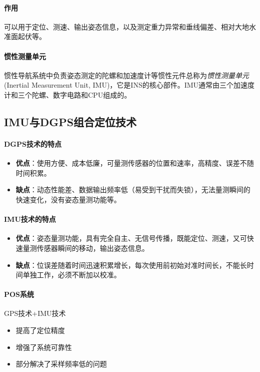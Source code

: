 \paragraph{作用}可以用于定位、测速、输出姿态信息，以及测定重力异常和垂线偏差、相对大地水准面起伏等。

\paragraph{惯性测量单元} 惯性导航系统中负责姿态测定的陀螺和加速度计等惯性元件总称为\textit{惯性测量单元}(Inertial Measurement Unit, IMU)，它是INS的核心部件。IMU通常由三个加速度计和三个陀螺、数字电路和CPU组成的。

\subsection{IMU与DGPS组合定位技术} %
\paragraph{DGPS技术的特点}
\begin{itemize}
	\item \textbf{优点}：使用方便、成本低廉，可量测传感器的位置和速率，高精度、误差不随时间积累。
	\item \textbf{缺点}：动态性能差、数据输出频率低（易受到干扰而失锁），无法量测瞬间的快速变化，没有姿态量测功能等。
\end{itemize}

\paragraph{IMU技术的特点}
\begin{itemize}
	\item \textbf{优点}：姿态量测功能，具有完全自主、无信号传播，既能定位、测速，又可快速量测传感器瞬间的移动，输出姿态信息。
	\item \textbf{缺点}：位误差随着时间迅速积累增长，每次使用前初始对准时间长，不能长时间单独工作，必须不断加以校准。
\end{itemize}

\paragraph{POS系统}GPS技术+IMU技术
\begin{itemize}
	\item 提高了定位精度
	\item 增强了系统可靠性
	\item 部分解决了采样频率低的问题
\end{itemize}

